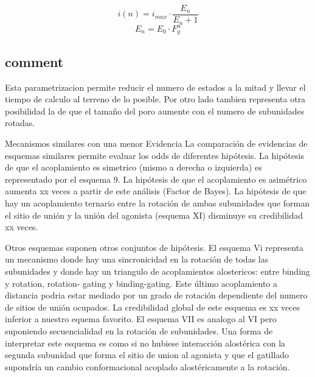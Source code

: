 \documentclass[a4paper,12pt]{article}
\begin{document}
	
	\begin{equation}
		i(n)= i_{max} \cdot \frac{E_n}{E_n+1}
		\label{eq:current_rotated_units}
	\end{equation}
	\begin{equation}
		E_n= E_0 \cdot F_g ^n
		\label{eq:efficacy_rotated}
	\end{equation}
	
	\subsection{comment}
		Esta parametrizacion permite reducir el numero de estados a la mitad y llevar el tiempo de calculo al terreno de lo posible. Por otro lado tambien representa otra posibilidad la de que el tamaño del poro aumente con el numero de subunidades rotadas. 
		
		Mecanismos similares con una menor Evidencia
		La comparación de evidencias de esquemas similares permite evaluar los odds de diferentes hipótesis. La hipótesis de que el acoplamiento es simetrico (mismo a derecha o izquierda) es representado por el esquema 9. La hipótesis de que el acoplamiento es asimétrico aumenta xx veces a partir de este análisis (Factor de Bayes). La hipótesis de que hay un acoplamiento ternario entre la rotación de ambas subunidades que forman el sitio de unión y la unión del agonista (esquema XI) disminuye su credibilidad xx veces.  
		
		Otros esquemas suponen otros conjuntos de hipótesis. 
		El esquema Vi representa un mecanismo donde hay una sincronicidad en la rotación de todas las subunidades y donde hay un triangulo de acoplamientos alostericos: entre binding y rotation, rotation- gating y binding-gating. Este último acoplamiento a distancia podria estar mediado por un grado de rotación dependiente del numero de sitios de unión ocupados. La credibilidad global de este esquema es xx veces inferior a nuestro equema favorito. 
		El esquema VII es analogo al VI pero suponiendo secuencialidad en la rotación de subunidades. Una forma de interpretar este esquema es como si no hubiese interacción alostérica con la segunda subunidad que forma el sitio de union al agonista y que el gatillado supondría un cambio conformacional acoplado alostéricamente a la rotación. 
		
\end{document}
